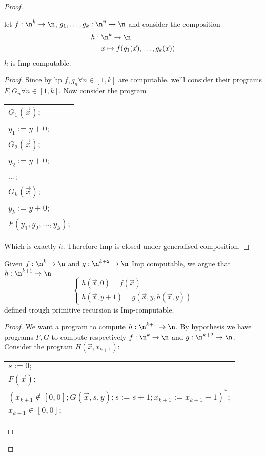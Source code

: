\begin{proof}
  \begin{lemma}
    let \(f : \n^k \to \n\), \(g_1,\dots,g_k : \n^n \to \n\) and
    consider the composition
    \begin{align*}
      h : \; & \n^k \to \n \\
      & \vec{x} \mapsto f(g_1(\vec{x}), \dots, g_k(\vec{x}))
    \end{align*}
    \(h\) is Imp-computable.
  \end{lemma}
  \begin{proof}
    Since by hp \(f, g_n \forall n\in [1,k]\)
    are computable, we'll consider their programs \(F, G_n\forall n
    \in [1,k]\). Now consider the program
    \begin{center}
      \begin{tabular}{l}
        \(G_1(\vec{x})\);\\[0pt]
        \(y_1 := y + 0\);\\[0pt]
        \(G_2(\vec{x})\);\\[0pt]
        \(y_2 := y + 0\);\\[0pt]
        \(\dots\);\\[0pt]
        \(G_k(\vec{x})\);\\[0pt]
        \(y_k := y + 0\);\\[0pt]
        \(F(y_1, y_2,\dots, y_k)\);\\[0pt]
      \end{tabular}
    \end{center}
    Which is exactly \(h\). Therefore Imp is closed under generalised
    composition.
  \end{proof}

  \begin{lemma}
    Given \(f : \n^k \to \n\) and \(g : \n^{k+2} \to \n\) Imp
    computable, we argue that \(h : \n^{k+1} \to \n\)
    \[\begin{cases}
    h(\vec{x}, 0) = f(\vec{x}) \\
    h(\vec{x}, y+1) = g(\vec{x}, y, h(\vec{x}, y))
    \end{cases}\]
    defined trough primitive recursion is Imp-computable.
  \end{lemma}
  \begin{proof}
    We want a program to compute \(h : \n^{k+1} \to \n\). By
    hypothesis we have programs \(F, G\) to compute respectively \(f:
    \n^k \to \n\) and \(g : \n^{k+2} \to \n\). Consider the program
    \(H(\vec{x},x_{k+1})\):
    \begin{center}
      \begin{tabular}{l}
        \(s := 0;\)\\[0pt]
        \(F(\vec{x});\)\\[0pt]
        \((x_{k+1} \not\in [0,0]; G(\vec{x},s,y);s:=s+1;x_{k+1}:=x_{k+1}-1)^*;\)\\[0pt]
        \(x_{k+1} \in [0,0];\)\\[0pt]
      \end{tabular}


\end{center}
\end{proof}
\end{proof}
